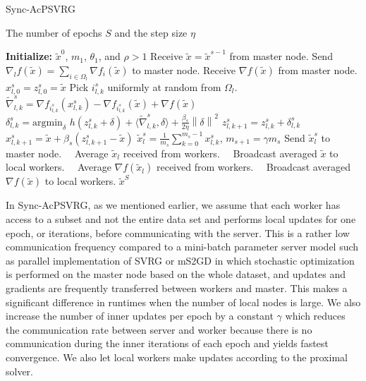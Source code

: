 \documentclass[conference]{IEEEtran}
\newcommand{\norm}[1]{\left\lVert#1\right\rVert}
\renewcommand{\algorithmicrequire}{
\textbf{Input:}}
\renewcommand{\algorithmicensure}{\textbf{Output:}}
\theoremstyle{definition}
\theoremstyle{remark}
\begin{document}
\begin{algorithm}[H]
\caption{Sync-AcPSVRG}\label{SyncVR-Algo-Single}
\begin{algorithmic}
\renewcommand{\algorithmicrequire}{\textbf{Input:}}
 \renewcommand{\algorithmicensure}{\textbf{Output:}}
  \newcommand{\INITIALIZE}{\item[\textbf{Initialize:}]}
\REQUIRE The number of epochs $S$ and the step size $\eta$
\INITIALIZE $\widetilde{x}^0$, $m_1$, $\theta_1$, and $\rho > 1$
\STATE Receive $\widetilde{x} = \widetilde{x}^{s-1}$ from master node.
\STATE  Send $\nabla_l f(\widetilde{x}) = \sum_{i\in\Omega_l}\nabla f_i(\widetilde{x})$ to master node.
\STATE  Receive $\nabla f(\widetilde{x})$ from master node.
 \STATE $x_{l,0}^s = z_{l,0}^s = \widetilde{x}$
 \STATE Pick $i_{l,k}^s$ uniformly at random from $\Omega_l$.
 \STATE $\widetilde{\nabla}_{l,k}^s = \nabla f_{i_{l,k}^s}(x_{l,k}^s) - \nabla f_{i_{l,k}^s}(\widetilde{x}) + \nabla f(\widetilde{x})$
 \STATE $\delta_{l,k}^s = \text{argmin}_{\delta}\,\,h(z_{l,k}^s+\delta)+\langle\widetilde{\nabla}_{l,k}^s,\delta\rangle + \frac{{\beta_s}}{2\eta}\norm{\delta}^2$
 \STATE $z_{l,k+1}^s = z_{l,k}^s + \delta_{l,k}^s$
 \STATE $x_{l,k+1}^s = \widetilde{x}+\beta_s(z_{l,k+1}^s-\widetilde{x})$
 \ENDFOR
\STATE $\widetilde{x}_{l}^s = \frac{1}{m_s}\sum_{k=0}^{m_s-1} x_{l,k}^s$, $m_{s+1} = \gamma m_s$
\STATE Send $\widetilde{x}_{l}^s$ to master node.
 \ENDFOR
 \ENDFOR
 \STATE\qquad\,\,\,\, Average $\widetilde{x}_l$ received from workers.
  \STATE\qquad\,\,\,\, Broadcast averaged $\widetilde{x}$ to local workers.
  \STATE\qquad\,\,\,\, Average $\nabla f(\widetilde{x}_l)$ received from workers.
  \STATE\qquad\,\,\,\, Broadcast averaged $\nabla f(\widetilde{x})$ to local workers.
 \ENSURE $\widetilde{x}^S$
\end{algorithmic}
\end{algorithm}

In Sync-AcPSVRG, as we mentioned earlier, we assume that each worker has access to a subset and not the entire data set and performs local updates for one epoch, or iterations, before communicating with
the  server. This  is  a  rather  low  communication  frequency
compared  to  a mini-batch parameter  server  model such as parallel implementation of SVRG \cite{Zhao2014} or mS2GD \cite{Konecny2016} in which stochastic optimization is performed on the master node based on the whole dataset, and updates and gradients are frequently transferred between workers and master. This  makes  a  significant  difference  in  runtimes  when  the
number of local nodes is large.
 We also increase the number of inner updates per epoch by a constant $\gamma$ which reduces the communication rate between server and worker because there is no communication during the inner iterations of each epoch and yields fastest convergence. We also let local workers make updates according to the proximal solver.
\end{document}
